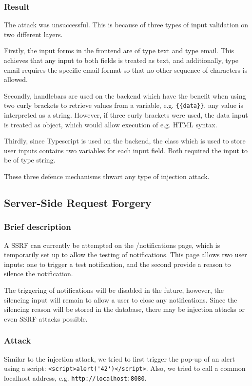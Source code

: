 \subsubsection{Result}
The attack was unsuccessful. This is because of three types of input validation on two different layers.

Firstly, the input forms in the frontend are of type text and type email. This achieves that any input to both fields is treated as text, and additionally, type email requires the specific email format so that no other sequence of characters is allowed. 

Secondly, handlebars are used on the backend which have the benefit when using two curly brackets to retrieve values from a variable, e.g. \lstinline "{{data}}", any value is interpreted as a string. However, if three curly brackets were used, the data input is treated as object, which would allow execution of e.g. HTML syntax.

Thirdly, since Typescript is used on the backend, the class which is used to store user inputs contains two variables for each input field. Both required the input to be of type string.

These three defence mechanisms thwart any type of injection attack.

\subsection{Server-Side Request Forgery}
\subsubsection{Brief description}
A SSRF can currently be attempted on the /notifications page, which is temporarily set up to allow the testing of notifications. This page allows two user inputs: one to trigger a test notification, and the second provide a reason to silence the notification.

The triggering of notifications will be disabled in the future, however, the silencing input will remain to allow a user to close any notifications. Since the silencing reason will be stored in the database, there may be injection attacks or even SSRF attacks possible.

\subsubsection{Attack}
Similar to the injection attack, we tried to first trigger the pop-up of an alert using a script: \lstinline "<script>alert('42')</script>". Also, we tried to call a common localhost address, e.g. \lstinline "http://localhost:8080". 

